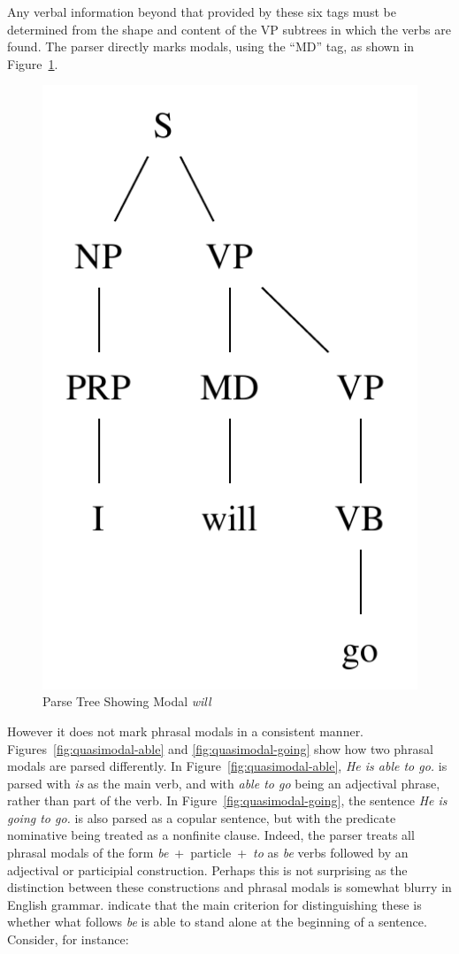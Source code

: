 \documentclass[main.tex]{subfiles}
\begin{document}
Any verbal information beyond that provided by these six tags must be determined from the shape and content of the VP subtrees in which the verbs are found. The parser directly marks modals, using the ``MD'' tag, as shown in Figure~\ref{fig:modal-parse}.
\begin{figure}[htbp]
\centering
\includegraphics[scale=0.6]{modal-parse.pdf}
\caption{Parse Tree Showing Modal \textit{will}}
\label{fig:modal-parse}
\end{figure}
However it does not mark phrasal modals in a consistent manner. Figures~\ref{fig:quasimodal-able} and \ref{fig:quasimodal-going} show how two phrasal modals are parsed differently. In Figure~\ref{fig:quasimodal-able}, \textit{He is able to go.} is parsed with \textit{is} as the main verb, and with \textit{able to go} being an adjectival phrase, rather than part of the verb. In Figure~\ref{fig:quasimodal-going}, the sentence \textit{He is going to go.} is also parsed as a copular sentence, but with the predicate nominative being treated as a nonfinite clause. Indeed, the parser treats all phrasal modals of the form \textit{be}~+~particle~+~\textit{to} as \textit{be} verbs followed by an adjectival or participial construction. Perhaps this is not surprising as the distinction between these constructions and phrasal modals is somewhat blurry in English grammar. \citet[footnote, p. 144]{quirk:1985} indicate that the main criterion for distinguishing these is whether what follows \textit{be} is able to stand alone at the beginning of a sentence. Consider, for instance:
\end{document}
